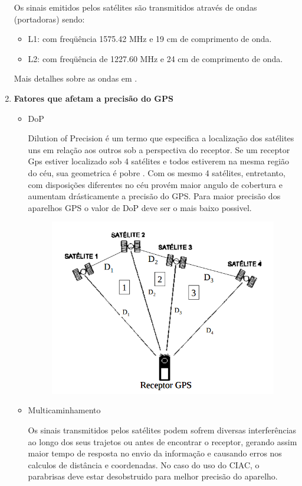 \begin{enumerate}
  Os sinais emitidos pelos satélites são transmitidos através de ondas (portadoras) sendo:
  \begin{itemize}
    \item L1: com freqüência 1575.42 MHz e 19 cm de comprimento de onda.
    \item L2: com freqüência de 1227.60 MHz e 24 cm de comprimento de onda.
  \end{itemize}

    Mais detalhes sobre as ondas em \cite{usp2}.

  \item \textbf{Fatores que afetam a precisão do GPS}

    \begin{itemize}
      \item  DoP

        Dilution of Precision é um termo que especifica a localização dos satélites uns em relação aos outros sob a perspectiva do receptor. Se um receptor Gps estiver localizado sob 4 satélites e todos estiverem na mesma região do céu, sua geometrica é pobre \cite{infoagro}.
        Com os mesmo 4 satélites, entretanto, com disposições diferentes no céu provém maior angulo de cobertura e aumentam drásticamente a precisão do GPS. Para maior precisão dos aparelhos GPS o valor de DoP deve ser o mais baixo possivel.

        \begin{figure}[h]
          \centering
          \includegraphics[width=400px, scale=0.5]{figuras/gps2}
          \label{table:gps}
        \end{figure}

      \item Multicaminhamento

      	Os sinais transmitidos pelos satélites podem sofrem diversas interferências ao longo dos seus trajetos ou antes de encontrar o receptor, gerando assim maior tempo de resposta no envio da informação e causando erros nos calculos de distância e coordenadas.
      	No caso do uso do CIAC, o parabrisas deve estar desobstruido para melhor precisão do aparelho.


\end{itemize}
\end{enumerate}
